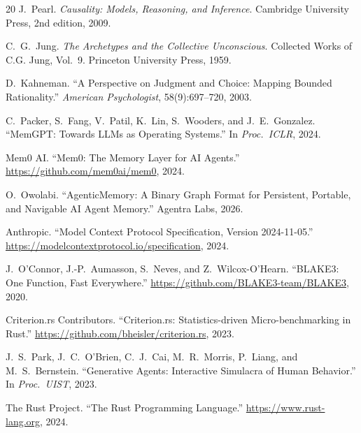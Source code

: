 \documentclass[10pt, twocolumn]{article}
\begin{document}
\begin{thebibliography}{20}
J.~Pearl. \textit{Causality: Models, Reasoning, and Inference}. Cambridge University Press, 2nd edition, 2009.

C.~G.~Jung. \textit{The Archetypes and the Collective Unconscious}. Collected Works of C.G. Jung, Vol.~9. Princeton University Press, 1959.

D.~Kahneman. ``A Perspective on Judgment and Choice: Mapping Bounded Rationality.'' \textit{American Psychologist}, 58(9):697--720, 2003.

C.~Packer, S.~Fang, V.~Patil, K.~Lin, S.~Wooders, and J.~E.~Gonzalez. ``MemGPT: Towards LLMs as Operating Systems.'' In \textit{Proc.\ ICLR}, 2024.

Mem0 AI. ``Mem0: The Memory Layer for AI Agents.'' \url{https://github.com/mem0ai/mem0}, 2024.

O.~Owolabi. ``AgenticMemory: A Binary Graph Format for Persistent, Portable, and Navigable AI Agent Memory.'' Agentra Labs, 2026.

Anthropic. ``Model Context Protocol Specification, Version 2024-11-05.'' \url{https://modelcontextprotocol.io/specification}, 2024.

J.~O'Connor, J.-P.~Aumasson, S.~Neves, and Z.~Wilcox-O'Hearn. ``BLAKE3: One Function, Fast Everywhere.'' \url{https://github.com/BLAKE3-team/BLAKE3}, 2020.

Criterion.rs Contributors. ``Criterion.rs: Statistics-driven Micro-benchmarking in Rust.'' \url{https://github.com/bheisler/criterion.rs}, 2023.

J.~S.~Park, J.~C.~O'Brien, C.~J.~Cai, M.~R.~Morris, P.~Liang, and M.~S.~Bernstein. ``Generative Agents: Interactive Simulacra of Human Behavior.'' In \textit{Proc.\ UIST}, 2023.

The Rust Project. ``The Rust Programming Language.'' \url{https://www.rust-lang.org}, 2024.

\end{thebibliography}
\end{document}
